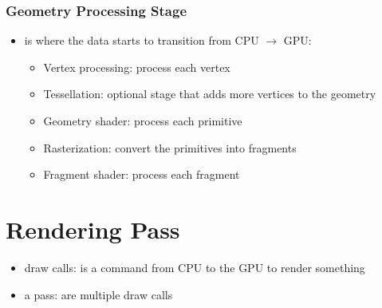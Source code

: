             \subsubsection{Geometry Processing Stage}
                \begin{itemize}
                    \item is where the data starts to transition from CPU $\rightarrow$ GPU:
                    \begin{itemize}
                        \item Vertex processing: process each vertex
                        \item Tessellation: optional stage that adds more vertices to the geometry
                        \item Geometry shader: process each primitive
                        \item Rasterization: convert the primitives into fragments
                        \item Fragment shader: process each fragment
                    \end{itemize}
                \end{itemize}

    \section{Rendering Pass}
        \begin{itemize}
            \item draw calls: is a command from CPU to the GPU to render something
            \item a pass: are multiple draw calls
        \end{itemize}